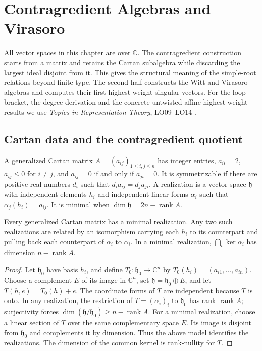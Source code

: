 \chapter{Contragredient Algebras and Virasoro}

All vector spaces in this chapter are over \(\mathbb C\).
The contragredient construction starts from a matrix and retains the
Cartan subalgebra while discarding the largest ideal disjoint from it.
This gives the structural meaning of the simple-root relations beyond
finite type. The second half constructs the Witt and Virasoro algebras
and computes their first highest-weight singular vectors.
For the loop bracket, the degree derivation and the concrete untwisted
affine highest-weight results we use \emph{Topics in Representation
Theory}, LO09--LO14 \cite[PDF pp.~26--28]{mg-reptopics}.

\section{Cartan data and the contragredient quotient}

\begin{definition}
\label{res:KM01}
A generalized Cartan matrix \(A=(a_{ij})_{1\le i,j\le n}\) has
integer entries, \(a_{ii}=2\), \(a_{ij}\le0\) for \(i\ne j\), and
\(a_{ij}=0\) if and only if \(a_{ji}=0\). It is symmetrizable
if there are positive real numbers \(d_i\) such that
\(d_i a_{ij}=d_j a_{ji}\). A realization is a vector space
\(\mathfrak h\) with independent elements \(h_i\) and independent
linear forms \(\alpha_i\) such that
\(\alpha_j(h_i)=a_{ij}\). It is minimal when
\(\dim\mathfrak h=2n-\operatorname{rank}A\).
\end{definition}

\begin{lemma}
\label{res:KM02}
Every generalized Cartan matrix has a minimal realization. Any
two such realizations are related by an isomorphism carrying each
\(h_i\) to its counterpart and pulling back each counterpart of
\(\alpha_i\) to \(\alpha_i\). In a minimal realization,
\(\bigcap_i\ker\alpha_i\) has dimension \(n-\operatorname{rank}A\).
\end{lemma}

\begin{proof}
Let \(\mathfrak h_0\) have basis \(h_i\), and define
\(T_0:\mathfrak h_0\to\mathbb C^n\) by
\(T_0(h_i)=(a_{i1},\ldots,a_{in})\).
Choose a complement \(E\) of its image in \(\mathbb C^n\),
set \(\mathfrak h=\mathfrak h_0\oplus E\), and let
\(T(h,e)=T_0(h)+e\). The coordinate forms of \(T\) are independent
because \(T\) is onto. In any realization, the restriction of
\(T=(\alpha_i)_i\) to \(\mathfrak h_0\) has rank
\(\operatorname{rank}A\); surjectivity forces
\(\dim(\mathfrak h/\mathfrak h_0)\ge n-\operatorname{rank}A\).
For a minimal realization, choose a linear section of \(T\) over the
same complementary space \(E\). Its image is disjoint from
\(\mathfrak h_0\) and complements it by dimension. Thus the above
model identifies the realizations. The dimension of the common
kernel is rank-nullity for \(T\).
\end{proof}

